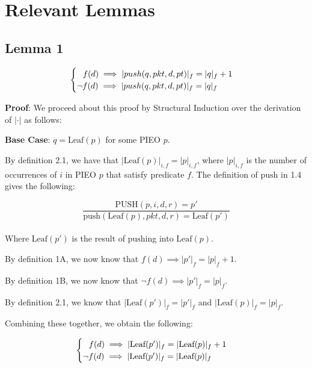 \documentclass{article}
\begin{document}
\section{Relevant Lemmas}

\subsection{Lemma 1}

$$\begin{cases}
    \hspace{0.25cm} \text{$f(d) \implies |push(q, pkt, d, pt)|_f = |q|_f + 1$}\\
    \text{$\neg f(d) \implies |push(q, pkt, d, pt)|_f = |q|_f$}
\end{cases}$$

\textbf{Proof}: We proceed about this proof by Structural Induction over the derivation of $| \cdot |$ as follows:\newline

\textbf{Base Case}: $q = \text{Leaf}(p)$ for some PIEO $p$.\newline

By definition 2.1, we have that $|\text{Leaf}(p)|_{i, f} = |p|_{i, f}$, where $|p|_{i, f}$ is the number of occurrences of $i$ in PIEO $p$ that satisfy predicate $f$. The definition of $\text{push}$ in 1.4 gives the following:\newline

$$\frac{\text{PUSH}(p, i, d, r) = p'}{\text{push}(\text{Leaf}(p), pkt, d, r) = \text{Leaf}(p')}$$\\[-10pt]

Where $\text{Leaf}(p')$ is the result of $\text{push}$ing into $\text{Leaf}(p)$.\newline

By definition 1A, we now know that $f(d) \implies |p'|_f = |p|_f + 1$.\newline

By definition 1B, we now know that $\neg f(d) \implies |p'|_f = |p|_f$.\newline

By definition 2.1, we know that $|\text{Leaf}(p')|_f = |p'|_f$ and $|\text{Leaf}(p)|_f = |p|_f$.\newline

Combining these together, we obtain the following:

$$\begin{cases}
    \hspace{0.25cm} \text{$f(d) \implies |\text{Leaf}(p')|_f = |\text{Leaf}(p)|_f + 1$}\\
    \text{$\neg f(d) \implies |\text{Leaf}(p')|_f = |\text{Leaf}(p)|_f$}
\end{cases}$$
\end{document}
